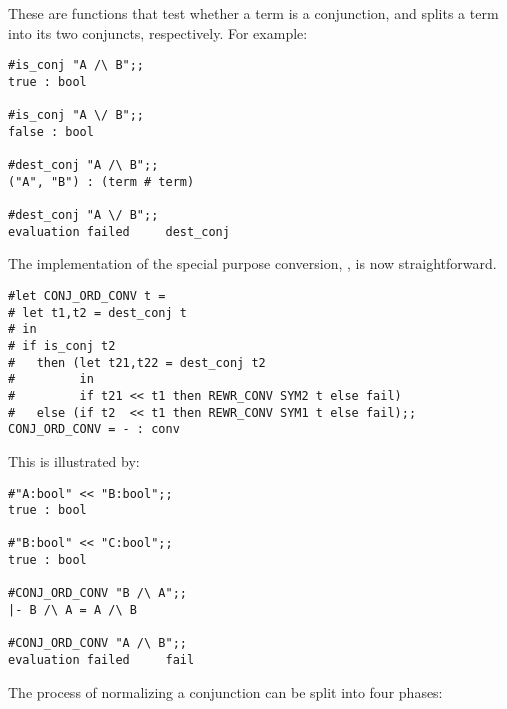 \noindent These are functions that test whether a term is a conjunction, and
splits a term into its two conjuncts, respectively. For example:

\begin{session}\begin{verbatim}
#is_conj "A /\ B";;
true : bool

#is_conj "A \/ B";;
false : bool

#dest_conj "A /\ B";;
("A", "B") : (term # term)

#dest_conj "A \/ B";;
evaluation failed     dest_conj
\end{verbatim}\end{session}

The implementation of the special purpose conversion,
, is now straightforward.


\begin{session}\begin{verbatim}
#let CONJ_ORD_CONV t =
# let t1,t2 = dest_conj t
# in
# if is_conj t2
#   then (let t21,t22 = dest_conj t2
#         in
#         if t21 << t1 then REWR_CONV SYM2 t else fail)
#   else (if t2  << t1 then REWR_CONV SYM1 t else fail);;
CONJ_ORD_CONV = - : conv
\end{verbatim}\end{session}

\noindent This is illustrated by:

\begin{session}\begin{verbatim}
#"A:bool" << "B:bool";;
true : bool

#"B:bool" << "C:bool";;
true : bool

#CONJ_ORD_CONV "B /\ A";;
|- B /\ A = A /\ B

#CONJ_ORD_CONV "A /\ B";;
evaluation failed     fail
\end{verbatim}\end{session}

The process of normalizing a conjunction can be split into four phases:



